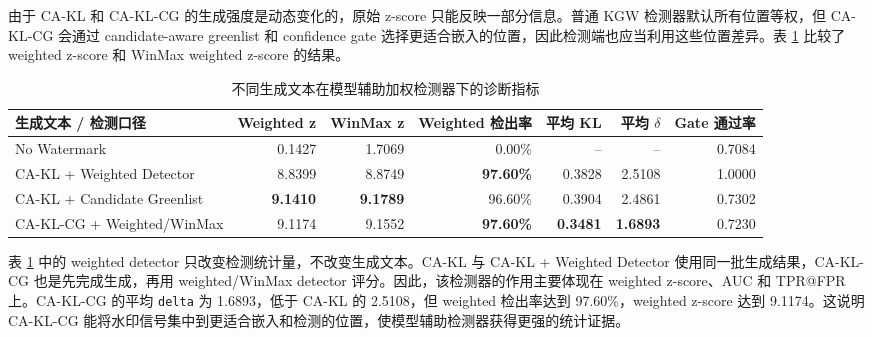 \documentclass[a4paper,UTF8,zihao=5]{ctexart}
\newcommand{\method}{CA-KL}
\newcommand{\fullmethod}{CA-KL-CG}
\begin{document}
由于 \method{} 和 \fullmethod{} 的生成强度是动态变化的，原始 z-score 只能反映一部分信息。普通 KGW 检测器默认所有位置等权，但 \fullmethod{} 会通过 candidate-aware greenlist 和 confidence gate 选择更适合嵌入的位置，因此检测端也应当利用这些位置差异。表 \ref{tab:weighted} 比较了 weighted z-score 和 WinMax weighted z-score 的结果。

\begin{table}[H]
    \centering
    \caption{不同生成文本在模型辅助加权检测器下的诊断指标}
    \label{tab:weighted}
    \scriptsize
    \setlength{\tabcolsep}{3pt}
    \begin{tabularx}{\textwidth}{p{}rrrrrr}
        \toprule
        生成文本 / 检测口径                     & Weighted z      & WinMax z        & Weighted 检出率     & 平均 KL           & 平均 $\delta$     & Gate 通过率 \\
        \midrule
        No Watermark                    & 0.1427          & 1.7069          & 0.00\%           & --              & --              & 0.7084   \\
        \method{} + Weighted Detector   & 8.8399          & 8.8749          & \textbf{97.60\%} & 0.3828          & 2.5108          & 1.0000   \\
        CA-KL + Candidate Greenlist     & \textbf{9.1410} & \textbf{9.1789} & 96.60\%          & 0.3904          & 2.4861          & 0.7302   \\
        \fullmethod{} + Weighted/WinMax & 9.1174          & 9.1552          & \textbf{97.60\%} & \textbf{0.3481} & \textbf{1.6893} & 0.7230   \\
        \bottomrule
    \end{tabularx}
\end{table}

表 \ref{tab:weighted} 中的 weighted detector 只改变检测统计量，不改变生成文本。\method{} 与 \method{} + Weighted Detector 使用同一批生成结果，\fullmethod{} 也是先完成生成，再用 weighted/WinMax detector 评分。因此，该检测器的作用主要体现在 weighted z-score、AUC 和 TPR@FPR 上。\fullmethod{} 的平均 \texttt{delta} 为 1.6893，低于 \method{} 的 2.5108，但 weighted 检出率达到 97.60\%，weighted z-score 达到 9.1174。这说明 \fullmethod{} 能将水印信号集中到更适合嵌入和检测的位置，使模型辅助检测器获得更强的统计证据。
\end{document}
